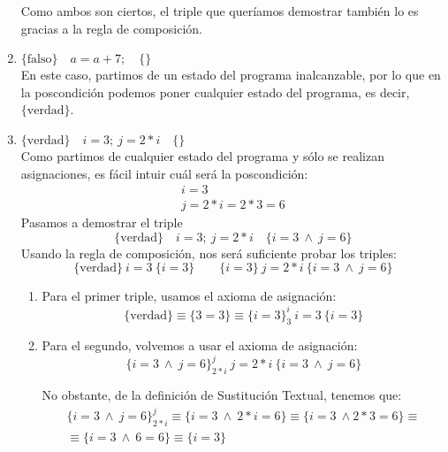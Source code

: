 \begin{ejercicio}
\begin{enumerate}
            Como ambos son ciertos, el triple que queríamos demostrar también lo es gracias a la regla de composición.
        \item $\{\text{falso}\} \quad a = a + 7; \quad \{ \}$\\
            En este caso, partimos de un estado del programa inalcanzable, por lo que en la poscondición podemos poner cualquier estado del programa, es decir, $\{\text{verdad}\}$.
        \item $\{\text{verdad}\} \quad i = 3;~j = 2 \ast i \quad \{ \}$\\
            Como partimos de cualquier estado del programa y sólo se realizan asignaciones, es fácil intuir cuál será la poscondición:
            \begin{gather*}
                i = 3 \\
                j = 2\ast i = 2\ast 3 = 6
            \end{gather*}
            Pasamos a demostrar el triple
            \begin{equation*}
                \{\text{verdad}\} \quad i = 3;~j = 2 \ast i \quad \{i=3\ \land\ j=6\}
            \end{equation*}
            Usando la regla de composición, nos será suficiente probar los triples:
            \begin{equation*}
                \{\text{verdad}\}\ i=3\ \{i=3\} \qquad \{i=3\}\ j=2\ast i\ \{i=3\ \land\ j=6\}
            \end{equation*}
            \begin{enumerate}
                \item Para el primer triple, usamos el axioma de asignación:
                \begin{equation*}
                    \{\text{verdad}\} \equiv \{3=3\} \equiv \{i=3\}^i_3\ i=3\ \{i=3\}
                \end{equation*}
                \item Para el segundo, volvemos a usar el axioma de asignación:
                \begin{equation*}
                    \{i=3\ \land\ j=6\}^j_{2\ast i}\ j=2\ast i\ \{i=3\ \land\ j=6\}
                \end{equation*}

                No obstante, de la definición de Sustitución Textual, tenemos que:
                \begin{multline*}
                    \{i=3\ \land\ j=6\}^j_{2\ast i} \equiv \{i=3\ \land\ 2\ast i=6\} \equiv \{i=3\ \land 2\ast 3=6\} \equiv \\ \equiv \{i=3\ \land\ 6=6\} \equiv \{i=3\}
                \end{multline*}


\end{enumerate}
\end{enumerate}
\end{ejercicio}
